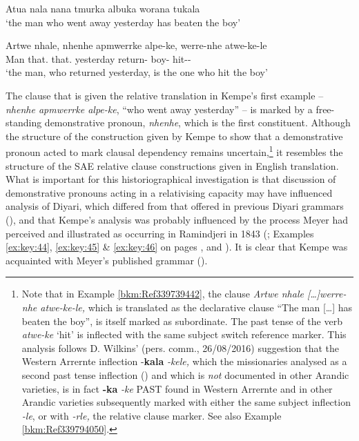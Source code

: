 \ea
\label{bkm:Ref339739442}Atua   nala        nana             tmurka       albuka     worana      tukala\\
\glt `the man who went away yesterday has beaten the boy'

\citep[11]{kempe_grammar_1891}

\gll Artwe    nhale,          nhenhe        apmwerrke   alpe-ke,          werre-nhe   atwe-ke-le\\
Man      that.    that.    yesterday     return-   boy-    hit--\\
\glt `the man, who returned yesterday, is the one who hit the boy'
\z

The clause that is given the relative translation in Kempe’s first example – \textit{nhenhe apmwerrke alpe-ke}, “who went away yesterday” – is marked by a free-standing demonstrative pronoun, \textit{nhenhe}, which is the first constituent. Although the structure of the construction given by Kempe to show that a demonstrative pronoun acted to mark clausal dependency remains uncertain,\footnote{Note that in Example \ref{bkm:Ref339739442}, the clause \textit{Artwe nhale […]werre-nhe atwe-ke-le,} which is translated as the declarative clause “The man […] has beaten the boy”, is itself marked as subordinate. The past tense of the verb \textit{atwe-ke} `hit' is inflected with the same subject switch reference marker. This analysis follows D. Wilkins' (pers. comm., 26/08/2016) suggestion that the Western Arrernte inflection -\textbf{kala} \textit{-kele,} which the missionaries analysed as a second past tense inflection () and which is \textit{not} documented in other Arandic varieties, is in fact \textbf{{}-ka} \textit{-ke} PAST found in Western Arrernte and in other Arandic varieties subsequently marked with either the same subject inflection \textit{-le}, or with \textit{-rle,} the relative clause marker. See also Example \ref{bkm:Ref339794050}.} it resembles the structure of the SAE relative clause constructions given in English translation. What is important for this historiographical investigation is that  discussion of demonstrative pronouns acting in a relativising capacity may have influenced  analysis of Diyari, which differed from that offered in previous Diyari grammars (), and that Kempe’s analysis was probably influenced by the process Meyer had perceived and illustrated as occurring in Ramindjeri in 1843 (; Examples \ref{ex:key:44}, \ref{ex:key:45} \& \ref{ex:key:46} on pages \pageref{ex:key:44}, \pageref{ex:key:45} and \pageref{ex:key:46}). It is clear that Kempe was acquainted with Meyer’s published grammar ().


